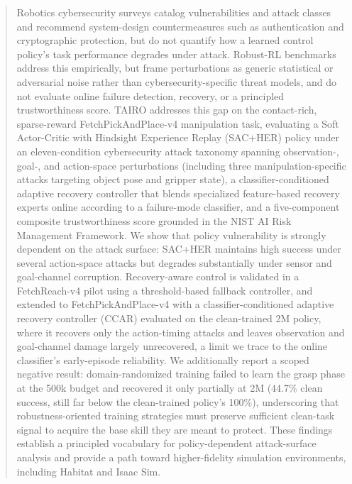 \documentclass[conference]{IEEEtran}
\begin{document}
\begin{abstract}
Robotics cybersecurity surveys catalog vulnerabilities and attack classes and recommend system-design countermeasures such as authentication and cryptographic protection, but do not quantify how a learned control policy's task performance degrades under attack. Robust-RL benchmarks address this empirically, but frame perturbations as generic statistical or adversarial noise rather than cybersecurity-specific threat models, and do not evaluate online failure detection, recovery, or a principled trustworthiness score.
TAIRO addresses this gap on the
contact-rich, sparse-reward FetchPickAndPlace-v4 manipulation task, evaluating a
Soft Actor-Critic with Hindsight Experience Replay (SAC+HER) policy under an
eleven-condition cybersecurity attack taxonomy spanning observation-, goal-, and
action-space perturbations (including three manipulation-specific attacks targeting
object pose and gripper state), a classifier-conditioned adaptive recovery controller
that blends specialized feature-based recovery experts online according to a failure-mode
classifier, and a five-component composite trustworthiness score grounded in the NIST AI
Risk Management Framework. We
show that policy vulnerability is strongly dependent on the attack surface: SAC+HER
maintains high success under several action-space attacks but degrades substantially
under sensor and goal-channel corruption. Recovery-aware control is validated in a
FetchReach-v4 pilot using a threshold-based fallback controller, and extended to
FetchPickAndPlace-v4 with a classifier-conditioned adaptive recovery controller (CCAR)
evaluated on the clean-trained 2M policy, where it recovers only the action-timing
attacks and leaves observation and goal-channel damage largely unrecovered, a limit we
trace to the online classifier's early-episode reliability. We additionally report a
scoped negative result: domain-randomized training failed to learn the grasp phase at
the 500k budget and recovered it only partially at 2M (44.7\% clean success, still far
below the clean-trained policy's 100\%), underscoring that robustness-oriented training
strategies must preserve sufficient clean-task signal to acquire the base skill they are
meant to protect. These findings
establish a principled vocabulary for policy-dependent attack-surface analysis and
provide a path toward higher-fidelity simulation environments, including Habitat and
Isaac Sim.
\end{abstract}
\end{document}
